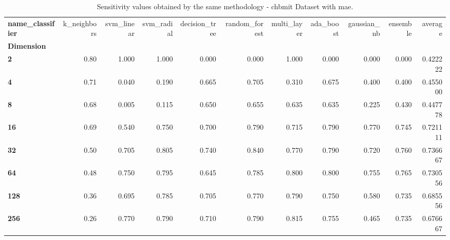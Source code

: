 \begin{table}
\centering
\caption{Sensitivity values obtained by the same methodology - chbmit Dataset with mae.}
\label{sensitivity_chbmit_mae-reproduction}
\begin{tabular}{lrrrrrrrrrr}
\toprule
\textbf{name\_classifier} &  k\_neighbors &  svm\_linear &  svm\_radial &  decision\_tree &  random\_forest &  multi\_layer &  ada\_boost &  gaussian\_nb &  ensemble &   average \\
\textbf{Dimension} &              &             &             &                &                &              &            &              &           &           \\
\midrule
\textbf{2        } &         0.80 &       1.000 &       1.000 &          0.000 &          0.000 &        1.000 &      0.000 &        0.000 &     0.000 &  0.422222 \\
\textbf{4        } &         0.71 &       0.040 &       0.190 &          0.665 &          0.705 &        0.310 &      0.675 &        0.400 &     0.400 &  0.455000 \\
\textbf{8        } &         0.68 &       0.005 &       0.115 &          0.650 &          0.655 &        0.635 &      0.635 &        0.225 &     0.430 &  0.447778 \\
\textbf{16       } &         0.69 &       0.540 &       0.750 &          0.700 &          0.790 &        0.715 &      0.790 &        0.770 &     0.745 &  0.721111 \\
\textbf{32       } &         0.50 &       0.705 &       0.805 &          0.740 &          0.840 &        0.770 &      0.790 &        0.720 &     0.760 &  0.736667 \\
\textbf{64       } &         0.48 &       0.750 &       0.795 &          0.645 &          0.785 &        0.800 &      0.800 &        0.755 &     0.765 &  0.730556 \\
\textbf{128      } &         0.36 &       0.695 &       0.785 &          0.705 &          0.770 &        0.790 &      0.750 &        0.580 &     0.735 &  0.685556 \\
\textbf{256      } &         0.26 &       0.770 &       0.790 &          0.710 &          0.790 &        0.815 &      0.755 &        0.465 &     0.735 &  0.676667 \\
\bottomrule
\end{tabular}
\end{table}
